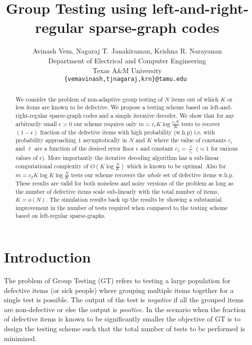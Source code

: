 \documentclass[conference,twocolumn]{IEEEtran}
\def\ceps{c_{\epsilon}}
\begin{document}
\title{Group Testing using left-and-right-regular sparse-graph codes}
\author{Avinash Vem, Nagaraj T. Janakiraman, Krishna R. Narayanan\\
Department of Electrical and Computer Engineering \\
Texas A\&M University\\
{\tt\small {\{vemavinash,tjnagaraj,krn\}@tamu.edu} }}

\maketitle
\begin{abstract} 
We consider the problem of non-adaptive group testing of $N$ items out of which $K$ or less items are known to be defective. We propose a testing scheme based on left-and-right-regular sparse-graph codes and a simple iterative decoder. We show that for any arbitrarily small $\epsilon>0$ our scheme requires only $m=\ceps K\log \frac{c_1N}{K}$ tests to recover $(1-\epsilon)$ fraction of the defective items with high probability (w.h.p) i.e. with probability approaching $1$ asymptotically in $N$ and $K$ where the value of constants $\ceps$ and $\ell$ are a function of the desired error floor $\epsilon$ and constant $c_1=\frac{\ell}{\ceps}$ ($\approx 1$ for various values of $\epsilon$). More importantly the iterative decoding algorithm has a sub-linear computational complexity of $O(K\log \frac{N}{K})$ which is known to be optimal. Also for $m=c_2 K\log K\log \frac{N}{K}$ tests our scheme recovers the \textit{whole} set of defective items w.h.p. These results are valid for both noiseless and noisy versions of the problem as long as the number of defective items scale sub-linearly with the total number of items, $K=o(N)$. The simulation results back up the results by showing a substantial improvement in the number of tests required when compared to the testing scheme based on left-regular sparse-graphs.
\end{abstract}

\section{Introduction}
The problem of Group Testing (GT) refers to testing a large population for defective items (or sick people) where grouping multiple items together for a single test is possible. The output of the test is \textit{negative} if all the grouped items are non-defective or else the output is \textit{positive.} In the scenario when the fraction of defective items is known to be significantly smaller the objective of GT is to design the testing scheme such that the total number of tests to be performed is minimized. 
\end{document}
